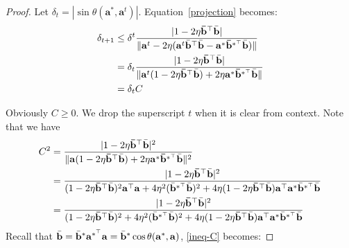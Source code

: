 \documentclass{article}
\theoremstyle{plain}
\theoremstyle{definition}
\theoremstyle{remark}
\begin{document}
\begin{proof}
    
    Let $\delta_t = |\sin \theta (\mathbf{a}^*, \mathbf{a}^t)|$. Equation~\eqref{projection} becomes:
    \begin{align}
        \delta_{t+1} &\leq  \delta^{t} \frac{ |1- 2\eta \mathbf{\Bar{b}}^{\top}\Bar{\mathbf{b}}|}{\lVert \mathbf{a}^t- 2\eta (\mathbf{a}^t\Bar{\mathbf{b}}^\top\Bar{\mathbf{b}}-\mathbf{a}^*\mathbf{\Bar{b}}^{*^\top}\Bar{\mathbf{b}})\rVert} \\
        & = \delta_{t} \frac{|1- 2\eta \mathbf{\Bar{b}}^{\top}\Bar{\mathbf{b}}|}{\lVert \mathbf{a}^t(1- 2\eta \mathbf{\Bar{b}}^{\top}\Bar{\mathbf{b}}) +2\eta\mathbf{a}^*\mathbf{\Bar{b}}^{*^\top}\Bar{\mathbf{b}}\rVert} \\
        & = \delta_{t} C
    \end{align}

  Obviously $C \ge 0$. We drop the superscript $t$ when it is clear from context. Note that we have
  \begin{align}
      C^2 &= \frac{|1- 2\eta \mathbf{\Bar{b}}^{\top}\Bar{\mathbf{b}}|^2}{\lVert \mathbf{a}(1- 2\eta \mathbf{\Bar{b}}^{\top}\Bar{\mathbf{b}}) +2\eta\mathbf{a}^*\mathbf{\Bar{b}}^{*^\top}\Bar{\mathbf{b}}\rVert^2} \\
      & = \frac{|1- 2\eta \mathbf{\Bar{b}}^{\top}\Bar{\mathbf{b}} |^2}{(1- 2\eta \mathbf{\Bar{b}}^{\top}\Bar{\mathbf{b}})^2 \mathbf{a}^\top\mathbf{a} + 4\eta^2 (\Bar{\mathbf{b}}^{*^\top}\Bar{\mathbf{b}})^2 + 4\eta (1- 2\eta \mathbf{\Bar{b}}^{\top}\Bar{\mathbf{b}}) \mathbf{a}^\top \mathbf{a}^* \Bar{\mathbf{b}}^{*^\top}\Bar{\mathbf{b}} } \\
      & = \frac{|1- 2\eta \mathbf{\Bar{b}}^{\top}\Bar{\mathbf{b}}|^2}{(1- 2\eta \mathbf{\Bar{b}}^{\top}\Bar{\mathbf{b}})^2  + 4\eta^2 (\Bar{\mathbf{b}}^{*^\top}\Bar{\mathbf{b}})^2  + 4\eta (1- 2\eta \mathbf{\Bar{b}}^{\top}\Bar{\mathbf{b}})\mathbf{a}^\top \mathbf{a}^* \Bar{\mathbf{b}}^{*^\top}\Bar{\mathbf{b}} }  \label{ineq-C}
  \end{align}
  Recall that $\Bar{\mathbf{b}} = \Bar{\mathbf{b}}^* \mathbf{a}^{*^\top}\mathbf{a} = \Bar{\mathbf{b}}^* \cos \theta (\mathbf{a}^*, \mathbf{a})$, \eqref{ineq-C} becomes:

\end{proof}
\end{document}
